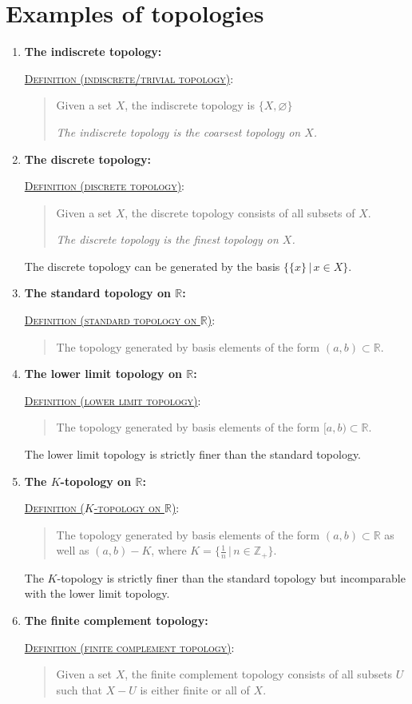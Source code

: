 \documentclass[letterpaper, 12pt]{book}
\newcommand{\RR}{\mathbb{R}}
\newcommand{\ZZ}{\mathbb{Z}}
\newcommand{\defn}[2]{\textsc{\underline{Definition (#1)}:}\begin{quote} #2\end{quote}}
\let\emptyset\varnothing
\begin{document}
\section{Examples of topologies}
    \begin{enumerate}[resume]
    \item \textbf{The indiscrete topology:}

        \defn{indiscrete/trivial topology}{Given a set $X$, the indiscrete topology is $\{X, \emptyset\}$

        \textit{The indiscrete topology is the coarsest topology on $X$.}}
    \item \textbf{The discrete topology:}

        \defn{discrete topology}{Given a set $X$, the discrete topology consists of all subsets of $X$.

        \textit{The discrete topology is the finest topology on $X$.}}

        The discrete topology can be generated by the basis $\{\{x\}\,|\,x\in X\}$.
    \item \textbf{The standard topology on $\RR$:}

        \defn{standard topology on $\RR$}{The topology generated by basis elements of the form $(a, b) \subset\RR$.}
    \item \textbf{The lower limit topology on $\RR$:}

        \defn{lower limit topology}{The topology generated by basis elements of the form $[a, b)\subset\RR$.}

        The lower limit topology is strictly finer than the standard topology.
    \item \textbf{The $K$-topology on $\RR$:}

        \defn{$K$-topology on $\RR$}{The topology generated by basis elements of the form $(a, b)\subset\RR$ as well as $(a, b) - K$, where $K = \{\tfrac{1}{n}\,|\,n\in\ZZ_+\}$.}

        The $K$-topology is strictly finer than the standard topology but incomparable with the lower limit topology.
    \item \textbf{The finite complement topology:}

        \defn{finite complement topology}{Given a set $X$, the finite complement topology consists of all subsets $U$ such that $X-U$ is either finite or all of $X$.}
    \end{enumerate}
\end{document}
